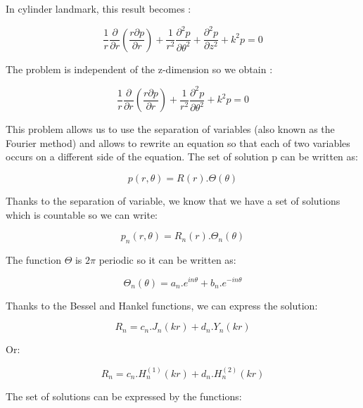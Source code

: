 In cylinder landmark, this result becomes :

\begin{equation}
 \frac{1}{r}\frac{\partial}{\partial r}(
 \frac{ r \partial p}{\partial r}) + \frac{1}{r^2}\frac{\partial^2 p}{\partial \theta^2} + \frac{\partial^2 p}{\partial z^2} + k^2 p = 0 
\end{equation}

The problem is independent of the z-dimension so we obtain :

\begin{equation}
 \frac{1}{r}\frac{\partial}{\partial r}(
 \frac{ r \partial p}{\partial r}) + \frac{1}{r^2}\frac{\partial^2 p}{\partial \theta^2} + k^2 p = 0 
\end{equation}

This problem allows us to use the separation of variables (also known as the Fourier method) and allows to rewrite an equation so that each of two variables occurs on a different side of the equation. The set of solution p can be written as:

\begin{equation}
 p(r,\theta) = R(r).\Theta(\theta)
\end{equation}

Thanks to the separation of variable, we know that we have a set of solutions which is countable so we can write:

\begin{equation}
p_{n}(r,\theta) = R_{n}(r).\Theta_{n}(\theta)
\end{equation}

The function $\Theta$ is $2\pi$ periodic so it can be written as:

\begin{equation}
\Theta_{n}(\theta) = a_{n}.e^{in\theta} + b_{n}.e^{-in\theta}
\end{equation}

Thanks to the Bessel and Hankel functions, we can express the solution:

\begin{equation}
R_{n} = c_{n}.J_{n}(kr) + d_{n}.Y_{n}(kr)
\end{equation}

Or:

\begin{equation}
R_{n} = c_{n}.H^{(1)}_{n}(kr) + d_{n}.H^{(2)}_{n}(kr)
\end{equation}

The set of solutions can be expressed by the functions:

